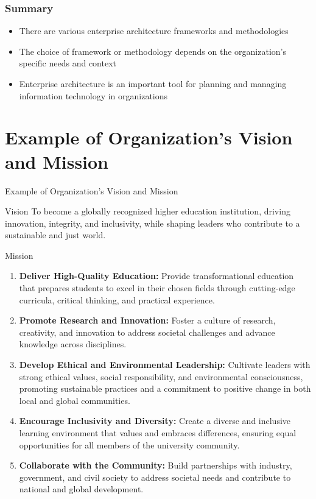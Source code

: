 \documentclass[aspectratio=169, table]{beamer}
\begin{document}
    \begin{frame}
        \frametitle{Summary}
        \begin{itemize}
            \item There are various enterprise architecture frameworks and methodologies
            \item The choice of framework or methodology depends on the organization's specific needs and context
            \item Enterprise architecture is an important tool for planning and managing information technology in organizations
        \end{itemize}
    \end{frame}



\section{Example of Organization's Vision and Mission}

\begin{frame}
	\centering
	\Huge Example of Organization's Vision and Mission
\end{frame}

\begin{frame}{Vision}
	To become a globally recognized higher education institution, driving innovation, integrity, and inclusivity, while shaping leaders who contribute to a sustainable and just world.
\end{frame}

\begin{frame}{Mission}
	\begin{enumerate}
		\item \textbf{Deliver High-Quality Education:} Provide transformational education that prepares students to excel in their chosen fields through cutting-edge curricula, critical thinking, and practical experience.
		\item \textbf{Promote Research and Innovation:} Foster a culture of research, creativity, and innovation to address societal challenges and advance knowledge across disciplines.
		\item \textbf{Develop Ethical and Environmental Leadership:} Cultivate leaders with strong ethical values, social responsibility, and environmental consciousness, promoting sustainable practices and a commitment to positive change in both local and global communities.
		\item \textbf{Encourage Inclusivity and Diversity:} Create a diverse and inclusive learning environment that values and embraces differences, ensuring equal opportunities for all members of the university community.
		\item \textbf{Collaborate with the Community:} Build partnerships with industry, government, and civil society to address societal needs and contribute to national and global development.
	\end{enumerate}
\end{frame}
\end{document}
